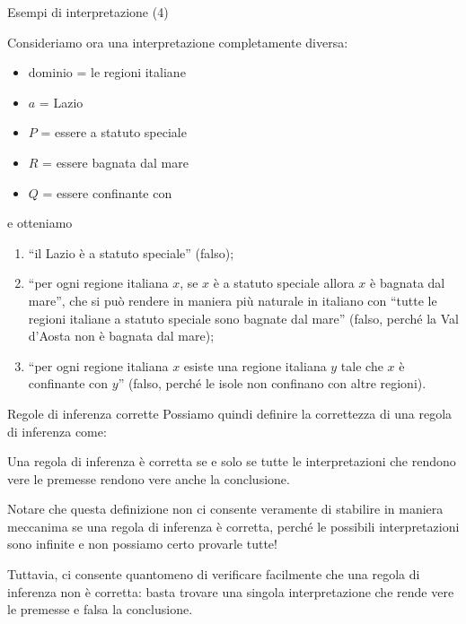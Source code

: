 \documentclass[aspectratio=169,10pt,dvipsnames,xcolor=table,handout]{beamer}
\begin{document}
\begin{frame}{Esempi di interpretazione (4)}
    \begin{example}
        Consideriamo ora una interpretazione completamente diversa:
        \begin{itemize}
            \item dominio = le regioni italiane
            \item $a$ = Lazio
            \item $P$ = essere a statuto speciale
            \item $R$ = essere bagnata dal mare
            \item $Q$ = essere confinante con
        \end{itemize}
        e otteniamo
        \begin{enumerate}
            \item ``il Lazio è a statuto speciale'' (falso);
            \item ``per ogni regione italiana $x$, se $x$ è a statuto speciale allora $x$ è bagnata dal mare'', che si può rendere in maniera più naturale in italiano con ``tutte le regioni italiane a statuto speciale sono bagnate dal mare'' (falso, perché la Val d'Aosta non è bagnata dal mare);
            \item ``per ogni regione italiana $x$ esiste una regione italiana $y$ tale che $x$ è confinante con $y$'' (falso, perché le isole non confinano con altre regioni).
        \end{enumerate}
    \end{example}
\end{frame}

\begin{frame}{Regole di inferenza corrette}
    Possiamo quindi definire la correttezza di una regola di inferenza come:
    \begin{definition}
        Una regola di inferenza è corretta se e solo se  tutte le interpretazioni che rendono vere le premesse rendono vere anche la conclusione.
    \end{definition}

    \medskip
    Notare che questa definizione non ci consente veramente di stabilire in maniera meccanima se una regola di inferenza è corretta, perché le possibili interpretazioni sono infinite e non possiamo certo provarle tutte!

    \medskip
    Tuttavia, ci consente quantomeno di verificare facilmente che una regola di inferenza non è corretta: basta trovare una singola interpretazione che rende vere le premesse e falsa la conclusione.
\end{frame}
\end{document}
